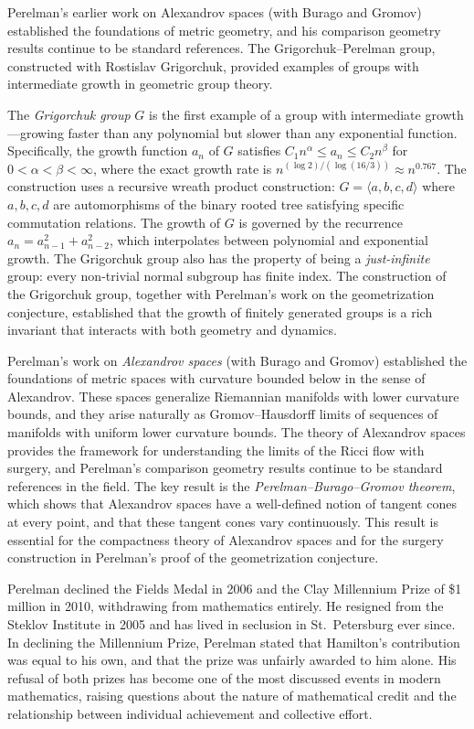 Perelman's earlier work on Alexandrov spaces (with Burago and Gromov) established the foundations of metric geometry, and his comparison geometry results continue to be standard references. The Grigorchuk--Perelman group, constructed with Rostislav Grigorchuk, provided examples of groups with intermediate growth in geometric group theory.

The \emph{Grigorchuk group} $G$ is the first example of a group with intermediate growth---growing faster than any polynomial but slower than any exponential function. Specifically, the growth function $a_n$ of $G$ satisfies $C_1 n^{\alpha} \le a_n \le C_2 n^{\beta}$ for $0 < \alpha < \beta < \infty$, where the exact growth rate is $n^{(\log 2)/(\log(16/3))} \approx n^{0.767}$. The construction uses a recursive wreath product construction: $G = \langle a, b, c, d \rangle$ where $a, b, c, d$ are automorphisms of the binary rooted tree satisfying specific commutation relations. The growth of $G$ is governed by the recurrence $a_n = a_{n-1}^2 + a_{n-2}^2$, which interpolates between polynomial and exponential growth. The Grigorchuk group also has the property of being a \emph{just-infinite} group: every non-trivial normal subgroup has finite index. The construction of the Grigorchuk group, together with Perelman's work on the geometrization conjecture, established that the growth of finitely generated groups is a rich invariant that interacts with both geometry and dynamics.

Perelman's work on \emph{Alexandrov spaces} (with Burago and Gromov) established the foundations of metric spaces with curvature bounded below in the sense of Alexandrov. These spaces generalize Riemannian manifolds with lower curvature bounds, and they arise naturally as Gromov--Hausdorff limits of sequences of manifolds with uniform lower curvature bounds. The theory of Alexandrov spaces provides the framework for understanding the limits of the Ricci flow with surgery, and Perelman's comparison geometry results continue to be standard references in the field. The key result is the \emph{Perelman--Burago--Gromov theorem}, which shows that Alexandrov spaces have a well-defined notion of tangent cones at every point, and that these tangent cones vary continuously. This result is essential for the compactness theory of Alexandrov spaces and for the surgery construction in Perelman's proof of the geometrization conjecture.

Perelman declined the Fields Medal in 2006 and the Clay Millennium Prize of \$1 million in 2010, withdrawing from mathematics entirely. He resigned from the Steklov Institute in 2005 and has lived in seclusion in St.~Petersburg ever since. In declining the Millennium Prize, Perelman stated that Hamilton's contribution was equal to his own, and that the prize was unfairly awarded to him alone. His refusal of both prizes has become one of the most discussed events in modern mathematics, raising questions about the nature of mathematical credit and the relationship between individual achievement and collective effort.

